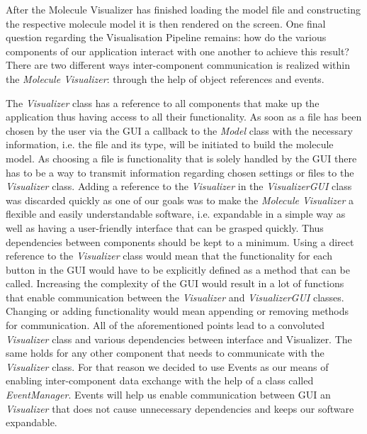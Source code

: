 After the Molecule Visualizer has finished loading the model file and constructing the respective molecule model it is then rendered on the screen. One final question regarding the Visualisation Pipeline remains: how do the various components of our  application interact with one another to achieve this result? There are two different ways inter-component communication is realized within the \textit{Molecule Visualizer}: through the help of object references and events.

The \textit{Visualizer} class has a reference to all components that make up the application thus having access to all their functionality. As soon as a file has been chosen by the user via the GUI a callback to the \textit{Model} class with the necessary information, i.e. the file and its type, will be initiated to build the molecule model. As choosing a file is functionality that is solely handled by the GUI there has to be a way to transmit information regarding chosen settings or files to the \textit{Visualizer} class. Adding a reference to the \textit{Visualizer} in the \textit{VisualizerGUI} class was discarded quickly as one of our goals was to make the \textit{Molecule Visualizer} a flexible and easily understandable software, i.e. expandable in a simple way as well as having a user-friendly interface that can be grasped quickly. Thus dependencies between components should be kept to a minimum. Using a direct reference to the \textit{Visualizer} class would mean that the functionality for each button in the GUI would have to be explicitly defined as a method that can be called. Increasing the complexity of the GUI would result in a lot of functions that enable communication between the \textit{Visualizer} and \textit{VisualizerGUI} classes. Changing or adding functionality would mean appending or removing methods for communication. All of the aforementioned points lead to a convoluted \textit{Visualizer} class and various dependencies between interface and Visualizer. The same holds for any other component that needs to communicate with the \textit{Visualizer} class. For that reason we decided to use Events as our means of enabling inter-component data exchange with the help of a class called \textit{EventManager}. Events will help us enable communication between GUI an \textit{Visualizer} that does not cause unnecessary dependencies and keeps our software expandable.

